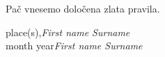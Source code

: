 %
\preface

Pač vnesemo določena zlata pravila.


\vspace{1cm}
\begin{flushright}\noindent
place(s),\hfill {\it First name  Surname}\\
month year\hfill {\it First name  Surname}\\
\end{flushright}


